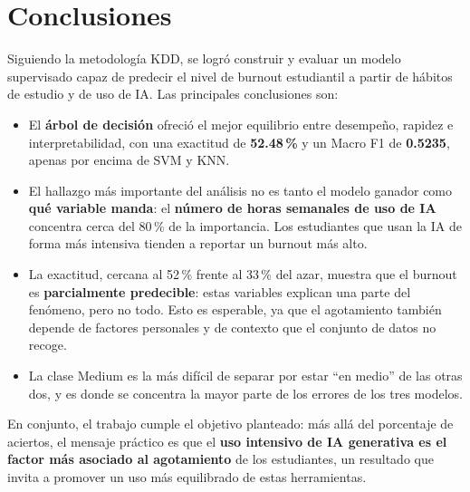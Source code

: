 \documentclass[11pt,letterpaper,twoside]{article}
\begin{document}
\section{Conclusiones}
\label{sec:conclusiones}

Siguiendo la metodología KDD, se logró construir y evaluar un modelo supervisado capaz de predecir el nivel de burnout estudiantil a partir de hábitos de estudio y de uso de IA. Las principales conclusiones son:

\begin{itemize}[leftmargin=*]
  \item El \textbf{árbol de decisión} ofreció el mejor equilibrio entre desempeño, rapidez e interpretabilidad, con una exactitud de \textbf{52.48\,\%} y un Macro F1 de \textbf{0.5235}, apenas por encima de SVM y KNN.
  \item El hallazgo más importante del análisis no es tanto el modelo ganador como \textbf{qué variable manda}: el \textbf{número de horas semanales de uso de IA} concentra cerca del 80\,\% de la importancia. Los estudiantes que usan la IA de forma más intensiva tienden a reportar un burnout más alto.
  \item La exactitud, cercana al 52\,\% frente al 33\,\% del azar, muestra que el burnout es \textbf{parcialmente predecible}: estas variables explican una parte del fenómeno, pero no todo. Esto es esperable, ya que el agotamiento también depende de factores personales y de contexto que el conjunto de datos no recoge.
  \item La clase Medium es la más difícil de separar por estar ``en medio'' de las otras dos, y es donde se concentra la mayor parte de los errores de los tres modelos.
\end{itemize}

En conjunto, el trabajo cumple el objetivo planteado: más allá del porcentaje de aciertos, el mensaje práctico es que el \textbf{uso intensivo de IA generativa es el factor más asociado al agotamiento} de los estudiantes, un resultado que invita a promover un uso más equilibrado de estas herramientas.
\end{document}
